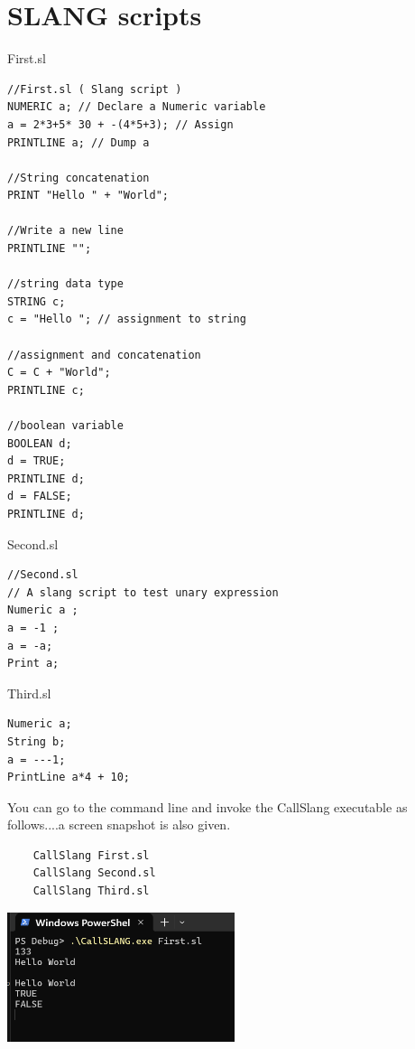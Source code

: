 \section{SLANG scripts}
First.sl
\lstset{style=csharp}
\begin{lstlisting}
//First.sl ( Slang script )
NUMERIC a; // Declare a Numeric variable
a = 2*3+5* 30 + -(4*5+3); // Assign
PRINTLINE a; // Dump a

//String concatenation
PRINT "Hello " + "World";

//Write a new line
PRINTLINE "";

//string data type
STRING c;
c = "Hello "; // assignment to string

//assignment and concatenation
C = C + "World";
PRINTLINE c;

//boolean variable
BOOLEAN d;
d = TRUE;
PRINTLINE d;
d = FALSE;
PRINTLINE d;
\end{lstlisting}
Second.sl
\lstset{style=csharp}
\begin{lstlisting}
//Second.sl
// A slang script to test unary expression
Numeric a ;
a = -1 ;
a = -a;
Print a;
\end{lstlisting}
Third.sl
\lstset{style=csharp}
\begin{lstlisting}
Numeric a;
String b;
a = ---1;
PrintLine a*4 + 10;
\end{lstlisting}
You can go to the command line and invoke the CallSlang executable as follows....a screen snapshot is also given.\\
\begin{verbatim}
	CallSlang First.sl
	CallSlang Second.sl
	CallSlang Third.sl
\end{verbatim}
\includegraphics[width=0.5\textwidth]{first.png}
